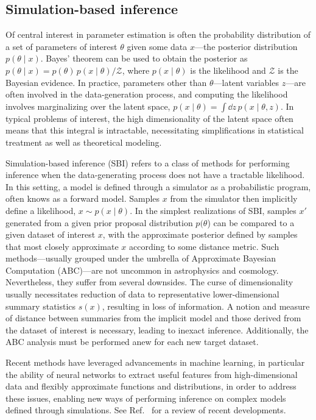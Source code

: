 \documentclass[prd,aps,10pt,nofootinbib,twocolumn,superscriptaddress,preprintnumbers,balancelastpage,longbibliography]{revtex4-1}
\begin{document}
\subsection{Simulation-based inference}

Of central interest in parameter estimation is often the probability distribution of a set of parameters of interest $\theta$ given some data $x$---the posterior distribution $p(\theta\mid x)$. Bayes' theorem can be used to obtain the posterior as $p(\theta\mid x) = p(\theta)\, p(x\mid\theta) / \mathcal Z$, where $p(x\mid\theta)$ is the likelihood and $\mathcal Z$ is the Bayesian evidence. In practice, parameters other than $\theta$---latent variables $z$---are often involved in the data-generation process, and computing the likelihood involves marginalizing over the latent space, $p(x\mid\theta) = \int \dd z\,p(x\mid\theta, z)$. In typical problems of interest, the high dimensionality of the latent space often means that this integral is intractable, necessitating simplifications in statistical treatment as well as theoretical modeling. 


Simulation-based inference (SBI) refers to a class of methods for performing inference when the data-generating process does not have a tractable likelihood. In this setting, a model is defined through a simulator as a probabilistic program, often knows as a forward model. Samples $x$ from the simulator then implicitly define a likelihood, $x\sim p(x\mid\theta)$. In the simplest realizations of SBI, samples $x'$ generated from a given prior proposal distribution $p(\theta$) can be compared to a given dataset of interest $x$, with the approximate posterior defined by samples that most closely approximate $x$ according to some distance metric. Such methods---usually grouped under the umbrella of Approximate Bayesian Computation (ABC)---are not uncommon in astrophysics and cosmology. Nevertheless, they suffer from several downsides. The curse of dimensionality usually necessitates reduction of data to representative lower-dimensional summary statistics $s(x)$, resulting in loss of information. A notion and measure of distance between summaries from the implicit model and those derived from the dataset of interest is necessary, leading to inexact inference. Additionally, the ABC analysis must be performed anew for each new target dataset.

Recent methods have leveraged advancements in machine learning, in particular the ability of neural networks to extract useful features from high-dimensional data and flexibly approximate functions and distributions, in order to address these issues, enabling new ways of performing inference on complex models defined through simulations. See Ref.~\cite{cranmer2020frontier} for a review of recent developments.
\end{document}
